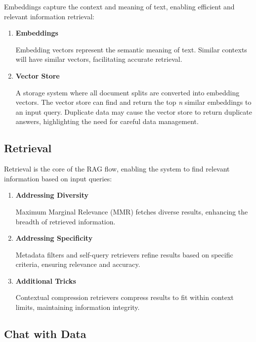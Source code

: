 \documentclass{article}
\begin{document}
Embeddings capture the context and meaning of text, enabling efficient and relevant information retrieval:

\begin{enumerate}[label=\textbf{\arabic*.}, left=0pt, align=left, itemindent=*]
    \item \textbf{Embeddings}

    Embedding vectors represent the semantic meaning of text. Similar contexts will have similar vectors, facilitating accurate retrieval.

    \item \textbf{Vector Store}

    A storage system where all document splits are converted into embedding vectors. The vector store can find and return the top \textit{n} similar embeddings to an input query. Duplicate data may cause the vector store to return duplicate answers, highlighting the need for careful data management.
\end{enumerate}

\bigskip
\bigskip

\subsection{Retrieval}

Retrieval is the core of the RAG flow, enabling the system to find relevant information based on input queries:

\begin{enumerate}[label=\textbf{\arabic*.}, left=0pt, align=left, itemindent=*]
    \item \textbf{Addressing Diversity}

    Maximum Marginal Relevance (MMR) fetches diverse results, enhancing the breadth of retrieved information.

    \item \textbf{Addressing Specificity}

    Metadata filters and self-query retrievers refine results based on specific criteria, ensuring relevance and accuracy.

    \item \textbf{Additional Tricks}

    Contextual compression retrievers compress results to fit within context limits, maintaining information integrity.
\end{enumerate}

\bigskip

\subsection{Chat with Data}
\end{document}
